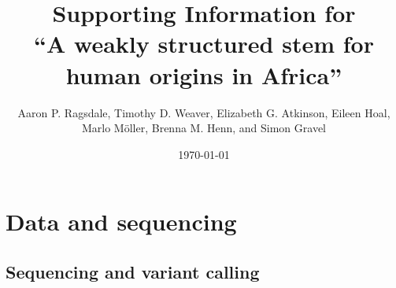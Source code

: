 \documentclass[]{article}
\begin{document}
\title{Supporting Information for\\
``A weakly structured stem for human origins in Africa''}
\author{Aaron P. Ragsdale, Timothy D. Weaver, Elizabeth G. Atkinson, Eileen Hoal, Marlo M\"{o}ller, Brenna M. Henn, and Simon Gravel}
\date{\normalsize \today}
\maketitle

\renewcommand{\thefigure}{S\arabic{figure}}
\renewcommand{\thetable}{S\arabic{table}}
\renewcommand{\theequation}{S\arabic{equation}}
\setcounter{figure}{0}
\setcounter{table}{0}
\setcounter{equation}{0}

\small
\tableofcontents
\normalsize
\newpage

\section{Data and sequencing}

\subsection{Sequencing and variant calling}
\end{document}

